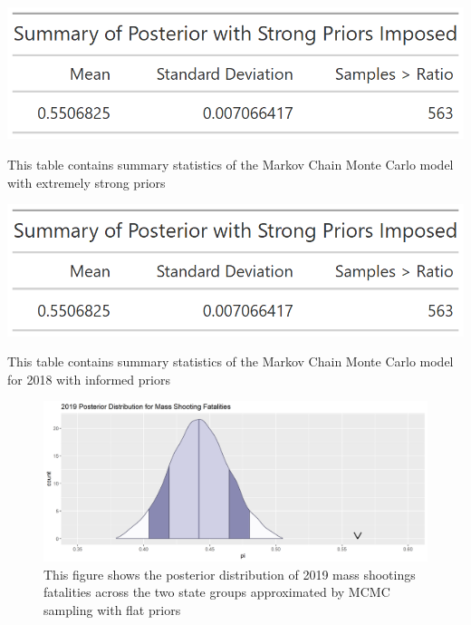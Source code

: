 \documentclass{article}
\begin{document}
\begin{table}[!h]
    \includegraphics[scale=.5]{Table5.png}\label{Table 5}
    \caption{This table contains summary statistics of the Markov Chain Monte Carlo model with extremely strong priors}
    \label{table:5}
\end{table}

\begin{table}[!h]
    \includegraphics[scale=.5]{Table5.png}\label{Table 6}
    \caption{This table contains summary statistics of the Markov Chain Monte Carlo model for 2018 with informed priors}
    \label{table:7}
\end{table}

\begin{figure}[!h]
    \centering
    \includegraphics[scale=.5]{Figure1.png}
    \caption{This figure shows the posterior distribution of 2019 mass shootings fatalities across the two state groups approximated by MCMC sampling with flat priors}
    \label{fig:1}
\end{figure}
\end{document}

